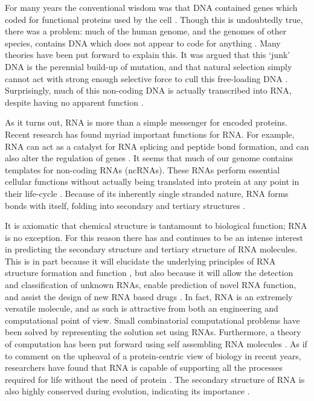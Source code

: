 \documentclass{cshonours}
\begin{document}
For many years the conventional wisdom was that DNA contained genes which coded for functional proteins used by the cell \cite{albertsessential}. Though this is undoubtedly true, there was a problem: much of the human genome, and the genomes of other species, contains DNA which does not appear to code for anything \cite{beaton1999eukaryotic}. Many theories have been put forward to explain this. It was argued that this `junk' DNA is the perennial build-up of mutation, and that natural selection simply cannot act with strong enough selective force to cull this free-loading DNA \cite{beaton1999eukaryotic}. Surprisingly, much of this non-coding DNA is actually transcribed into RNA, despite having no apparent function \cite{leung2013coral}. 

As it turns out, RNA is more than a simple messenger for encoded proteins. Recent research has found myriad important functions for RNA. For example, RNA can act as a catalyst for RNA splicing and peptide bond formation, and can also alter the regulation of genes \cite{xu2012statistical}. It seems that much of our genome contains templates for non-coding RNAs (ncRNAs). These RNAs perform essential cellular functions without actually being translated into protein at any point in their life-cycle \cite{leung2013coral}. Because of its inherently single stranded nature, RNA forms bonds with itself, folding into secondary and tertiary structures \cite{conn1998rna}.


It is axiomatic that chemical structure is tantamount to biological function; RNA is no exception. For this reason there has and continues to be an intense interest in predicting the secondary structure and tertiary structure of RNA molecules. This is in part because it will elucidate the underlying principles of RNA structure formation and function \cite{conn1998rna}, but also because it will allow the detection and classification of unknown RNAs, enable prediction of novel RNA function, and assist the design of new RNA based drugs \cite{condon2003problems}. In fact, RNA is an extremely versatile molecule, and as such is attractive from both an engineering and computational point of view. Small combinatorial computational problems have been solved by representing the solution set using RNAs. Furthermore, a theory of computation has been put forward using self assembling RNA molecules \cite{condon2003problems}. As if to comment on the upheaval of a protein-centric view of biology in recent years, researchers have found that RNA is capable of supporting all the processes required for life without the need of protein \cite{condon2003problems}. The secondary structure of RNA is also highly conserved during evolution, indicating its importance \cite{hofacker2008rna}. 
\end{document}
